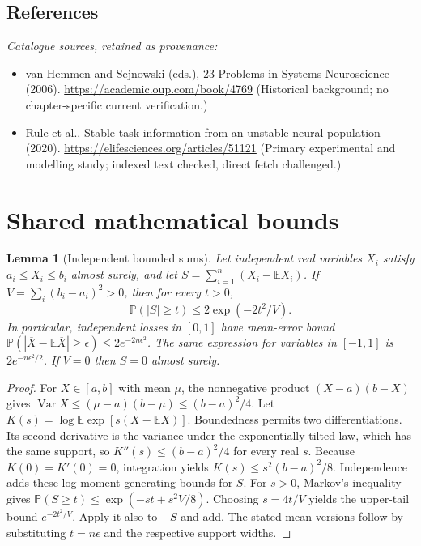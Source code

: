 \documentclass[11pt]{article}
\newcommand{\E}{\mathbb E}
\newcommand{\Prob}{\mathbb P}
\DeclareMathOperator{\Var}{Var}
\providecommand{\E}{\mathbb E}
\providecommand{\Prob}{\mathbb P}
\providecommand{\Var}{\operatorname{Var}}
\newtheorem{sharedlemma}{Lemma}[section]
\begin{document}
\subsection{References}
\noindent\emph{Catalogue sources, retained as provenance:}
\begin{itemize}
\item van Hemmen and Sejnowski (eds.), 23 Problems in Systems Neuroscience (2006). \url{https://academic.oup.com/book/4769} (Historical background; no chapter-specific current verification.)
\item Rule et al., Stable task information from an unstable neural population (2020). \url{https://elifesciences.org/articles/51121} (Primary experimental and modelling study; indexed text checked, direct fetch challenged.)
\end{itemize}
\clearpage


\appendix
\section{Shared mathematical bounds}\label{app:bounds}
\begin{sharedlemma}[Independent bounded sums]\label{lem:bounded}
Let independent real variables $X_i$ satisfy $a_i\leq X_i\leq b_i$ almost surely,
and let $S=\sum_{i=1}^n(X_i-\E X_i)$. If
$V=\sum_i(b_i-a_i)^2>0$, then for every $t>0$,
\[
 \Prob(|S|\geq t)\leq 2\exp(-2t^2/V).
\]
In particular, independent losses in $[0,1]$ have mean-error bound
$\Prob(|\overline X-\E\overline X|\geq\epsilon)
\leq2e^{-2n\epsilon^2}$. The same expression for variables in $[-1,1]$
is $2e^{-n\epsilon^2/2}$. If $V=0$ then $S=0$ almost surely.
\end{sharedlemma}
\begin{proof}
For $X\in[a,b]$ with mean $\mu$, the nonnegative product
$(X-a)(b-X)$ gives
$\Var X\leq(\mu-a)(b-\mu)\leq(b-a)^2/4$.
Let $K(s)=\log\E\exp[s(X-\E X)]$.
Boundedness permits two differentiations. Its second derivative is the variance
under the exponentially tilted law, which has the same support, so
$K''(s)\leq(b-a)^2/4$ for every real $s$.
Because $K(0)=K'(0)=0$, integration yields
$K(s)\leq s^2(b-a)^2/8$.
Independence adds these log moment-generating bounds for $S$.
For $s>0$, Markov's inequality gives
$\Prob(S\geq t)\leq\exp(-st+s^2V/8)$.
Choosing $s=4t/V$ yields the upper-tail bound $e^{-2t^2/V}$.
Apply it also to $-S$ and add. The stated mean versions follow by substituting
$t=n\epsilon$ and the respective support widths.
\end{proof}
\end{document}
